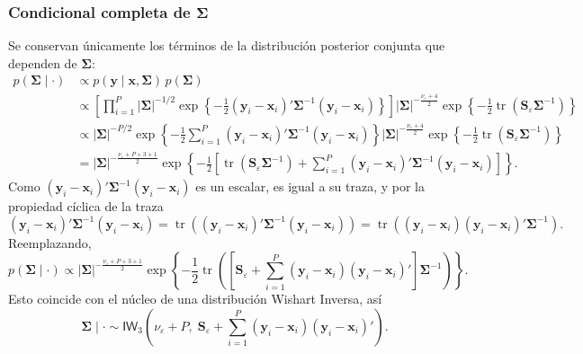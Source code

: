 \documentclass[11pt,a4paper]{article}
\begin{document}
\subsubsection*{Condicional completa de $\mathbf{\Sigma}$}

Se conservan únicamente los términos de la distribución posterior conjunta que dependen de $\mathbf{\Sigma}$:
\begin{align*}
p(\mathbf{\Sigma} \mid \cdot)
&\propto p(\boldsymbol{y} \mid \boldsymbol{x}, \mathbf{\Sigma})\, p(\mathbf{\Sigma}) \\[6pt]
&\propto \left[ \prod_{i=1}^{P} |\mathbf{\Sigma}|^{-1/2} \exp\left\{ -\frac{1}{2} (\boldsymbol{y}_i - \boldsymbol{x}_i)' \mathbf{\Sigma}^{-1} (\boldsymbol{y}_i - \boldsymbol{x}_i) \right\} \right]
|\mathbf{\Sigma}|^{-\frac{\nu_\varepsilon + 4}{2}} \exp\left\{ -\frac{1}{2} \operatorname{tr}(\mathbf{S}_\varepsilon \mathbf{\Sigma}^{-1}) \right\} \\[6pt]
&\propto |\mathbf{\Sigma}|^{-P/2} \exp\left\{ -\frac{1}{2} \sum_{i=1}^{P} (\boldsymbol{y}_i - \boldsymbol{x}_i)' \mathbf{\Sigma}^{-1} (\boldsymbol{y}_i - \boldsymbol{x}_i) \right\}
|\mathbf{\Sigma}|^{-\frac{\nu_\varepsilon + 4}{2}} \exp\left\{ -\frac{1}{2} \operatorname{tr}(\mathbf{S}_\varepsilon \mathbf{\Sigma}^{-1}) \right\} \\[6pt]
&= |\mathbf{\Sigma}|^{-\frac{\nu_\varepsilon + P + 3 + 1}{2}} \exp\left\{ -\frac{1}{2} \left[ \operatorname{tr}(\mathbf{S}_\varepsilon \mathbf{\Sigma}^{-1}) + \sum_{i=1}^{P} (\boldsymbol{y}_i - \boldsymbol{x}_i)' \mathbf{\Sigma}^{-1} (\boldsymbol{y}_i - \boldsymbol{x}_i) \right] \right\}.
\end{align*}
Como $(\boldsymbol{y}_i - \boldsymbol{x}_i)' \mathbf{\Sigma}^{-1} (\boldsymbol{y}_i - \boldsymbol{x}_i)$ es un escalar, es igual a su traza, y por la propiedad cíclica de la traza
\[
(\boldsymbol{y}_i - \boldsymbol{x}_i)' \mathbf{\Sigma}^{-1} (\boldsymbol{y}_i - \boldsymbol{x}_i)
= \operatorname{tr}\left( (\boldsymbol{y}_i - \boldsymbol{x}_i)' \mathbf{\Sigma}^{-1} (\boldsymbol{y}_i - \boldsymbol{x}_i) \right)
= \operatorname{tr}\left( (\boldsymbol{y}_i - \boldsymbol{x}_i)(\boldsymbol{y}_i - \boldsymbol{x}_i)' \mathbf{\Sigma}^{-1} \right).
\]
Reemplazando,
\[
p(\mathbf{\Sigma} \mid \cdot) \propto |\mathbf{\Sigma}|^{-\frac{\nu_\varepsilon + P + 3 + 1}{2}} \exp\left\{ -\frac{1}{2} \operatorname{tr}\left( \left[ \mathbf{S}_\varepsilon + \sum_{i=1}^{P} (\boldsymbol{y}_i - \boldsymbol{x}_i)(\boldsymbol{y}_i - \boldsymbol{x}_i)' \right] \mathbf{\Sigma}^{-1} \right) \right\}.
\]
Esto coincide con el núcleo de una distribución Wishart Inversa, así
\[
\mathbf{\Sigma} \mid \cdot \sim \textsf{IW}_3\left( \nu_\varepsilon + P, \; \mathbf{S}_\varepsilon + \sum_{i=1}^{P} (\boldsymbol{y}_i - \boldsymbol{x}_i)(\boldsymbol{y}_i - \boldsymbol{x}_i)' \right).
\]
\end{document}
